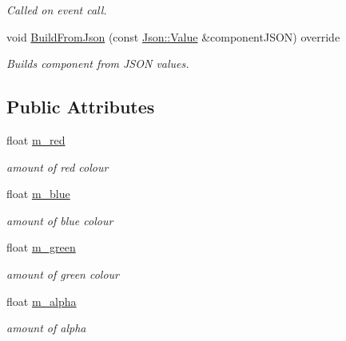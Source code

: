 \begin{DoxyCompactItemize}
\begin{DoxyCompactList}\small\item\em Called on event call. \end{DoxyCompactList}\item 
\hypertarget{class_colour_component_aed1ca4037054bfa011639dd3fcebeb34}{void \hyperlink{class_colour_component_aed1ca4037054bfa011639dd3fcebeb34}{Build\+From\+Json} (const \hyperlink{class_json_1_1_value}{Json\+::\+Value} \&component\+J\+S\+O\+N) override}\label{class_colour_component_aed1ca4037054bfa011639dd3fcebeb34}

\begin{DoxyCompactList}\small\item\em Builds component from J\+S\+O\+N values. \end{DoxyCompactList}\end{DoxyCompactItemize}
\subsection*{Public Attributes}
\begin{DoxyCompactItemize}
\item 
\hypertarget{class_colour_component_a8ade0f6438bffa3f1e6c895435ffa154}{float \hyperlink{class_colour_component_a8ade0f6438bffa3f1e6c895435ffa154}{m\+\_\+red}}\label{class_colour_component_a8ade0f6438bffa3f1e6c895435ffa154}

\begin{DoxyCompactList}\small\item\em amount of red colour \end{DoxyCompactList}\item 
\hypertarget{class_colour_component_a8da5ecb3619ae04479119083e1086bd3}{float \hyperlink{class_colour_component_a8da5ecb3619ae04479119083e1086bd3}{m\+\_\+blue}}\label{class_colour_component_a8da5ecb3619ae04479119083e1086bd3}

\begin{DoxyCompactList}\small\item\em amount of blue colour \end{DoxyCompactList}\item 
\hypertarget{class_colour_component_a679613f98b6d1677900aa3341016e7b5}{float \hyperlink{class_colour_component_a679613f98b6d1677900aa3341016e7b5}{m\+\_\+green}}\label{class_colour_component_a679613f98b6d1677900aa3341016e7b5}

\begin{DoxyCompactList}\small\item\em amount of green colour \end{DoxyCompactList}\item 
\hypertarget{class_colour_component_ae7f936cbf7c3c510d6a7aa83a6290190}{float \hyperlink{class_colour_component_ae7f936cbf7c3c510d6a7aa83a6290190}{m\+\_\+alpha}}\label{class_colour_component_ae7f936cbf7c3c510d6a7aa83a6290190}

\begin{DoxyCompactList}\small\item\em amount of alpha \end{DoxyCompactList}\end{DoxyCompactItemize}


